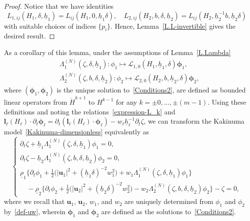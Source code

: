 \documentclass[11pt,leqno]{article}
\numberwithin{equation}{section}
\numberwithin{figure}{section}
\begin{document}
\begin{proof}
Notice that we have identities 
\[
L_{1,ij}(H_1,\delta,\underline{h}_1) = L_{ij}(H_1,0,\underline{h}_1\delta), \quad 
L_{2,ij}(H_2,b,\delta,\underline{h}_2) = L_{ij}(H_2,\underline{h}_2^{-1}b,\underline{h}_2\delta)
\]
%
with suitable choices of indices $\{p_i\}$. 
Hence, Lemma~\ref{L.L-invertible} gives the desired result. 
\end{proof}


As a corollary of this lemma, under the assumptions of Lemma~\ref{L.Lambda} 
%
\begin{align*}
& \Lambda_1^{(N)}(\zeta,\delta,\underline{h}_1) \colon \phi_1 \mapsto \mathcal{L}_{1,0}(H_1,\underline{h}_1,\delta)\bm{\phi}_1, \\
& \Lambda_2^{(N)}(\zeta,b,\delta,\underline{h}_2) \colon \phi_2 \mapsto \mathcal{L}_{2,0}(H_2,b,\underline{h}_2,\delta)\bm{\phi}_2, 
\end{align*}
%
where $(\bm{\phi}_1,\bm{\phi}_2)$ is the unique solution to~\eqref{Conditions2}, are defined as bounded linear operators 
from $\mathring{H}^{k+1}$ to $H^{k-1}$ for any $k=\pm 0,\dots, \pm(m-1)$. 
Using these definitions and noting the relations~\eqref{expression-L_k} and 
$\bm{l}_\ell(H_\ell)\cdot\partial_t\bm{\phi}_\ell
 = \partial_t(\bm{l}_\ell(H_\ell)\cdot\bm{\phi}_\ell)-w_\ell\underline{h}_\ell^{-1}\partial_t\zeta$, 
we can transform the Kakinuma model~\eqref{Kakinuma-dimensionless} equivalently as 
%
\begin{equation}\label{Kakinuma-evolution}
\begin{cases}
 \partial_t\zeta + \underline{h}_1\Lambda_1^{(N)}(\zeta,\delta,\underline{h}_1)\phi_1 = 0, \\
 \partial_t\zeta - \underline{h}_2\Lambda_1^{(N)}(\zeta,b,\delta,\underline{h}_2)\phi_2 = 0, \\
 \underline{\rho}_1\bigl\{ \partial_t\phi_1 
   + \frac12\bigl( |{\bm u}_1|^2 + (\underline{h}_1\delta)^{-2} w_1^2 \bigr)
   + w_1\Lambda_1^{(N)}(\zeta,\delta,\underline{h}_1)\phi_1 \bigr\} \\
 \quad
 - \underline{\rho}_2\bigl\{  \partial_t\phi_2 
  + \frac12\bigl( |{\bm u}_2|^2 +  (\underline{h}_2\delta)^{-2} w_2^2 \bigr)
  - w_2\Lambda_2^{(N)}(\zeta,b,\delta,\underline{h}_2)\phi_2 \bigr\} 
 - \zeta = 0, 
\end{cases}
\end{equation}
where we recall that ${\bm u}_1$, ${\bm u}_2$, $w_1$, and $w_2$ are uniquely determined from $\phi_1$ 
and $\phi_2$ by~\eqref{def-uw}, wherein ${\bm \phi}_1$ and ${\bm \phi}_2$ are defined as the solutions to~\eqref{Conditions2}. 
\end{document}
